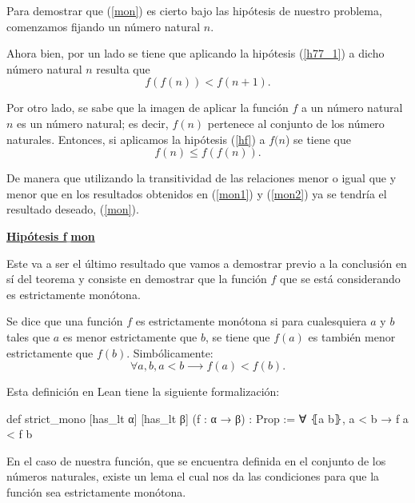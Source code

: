 \begin{demostracion}
  Para demostrar que (\ref{mon}) es cierto bajo las hipótesis de nuestro
  problema, comenzamos fijando un número natural \(n\).

  Ahora bien, por un lado se tiene que aplicando la hipótesis (\ref{h77_1})
  a dicho número natural \(n\) resulta que
  \begin{equation}\label{mon1}
    f(f(n)) < f(n+1).
  \end{equation}

  Por otro lado, se sabe que la imagen de aplicar la función \(f\) a un
  número natural \(n\) es un número natural; es decir, \(f(n)\) pertenece
  al conjunto de los número naturales. Entonces, si aplicamos la
  hipótesis (\ref{hf}) a \(f(n\)) se tiene que
  \begin{equation}\label{mon2}
    f(n) ≤ f(f(n)).
  \end{equation}

  De manera que utilizando la transitividad de las relaciones menor o
  igual que y menor que en los resultados obtenidos en (\ref{mon1}) y
  (\ref{mon2}) ya se tendría el resultado deseado, (\ref{mon}).

  \noindent
  \textbf{\underline{Hipótesis f\(\_\)mon}}

  Este va a ser el último resultado que vamos a demostrar previo a la
  conclusión en sí del teorema y consiste en demostrar que la función
  \(f\) que se está considerando es estrictamente monótona.

  \begin{definicion}\label{def:mono}
    Se dice que una función \(f\) es estrictamente monótona si para
    cualesquiera \(a\) y \(b\) tales que \(a\) es menor estrictamente que
    \(b\), se tiene que \(f(a)\) es también menor estrictamente que
    \(f(b)\). Simbólicamente:
    \begin{equation}
      ∀a,b, a < b ⟶ f(a) < f(b).
    \end{equation}
  \end{definicion}

  Esta definición en Lean tiene la siguiente formalización:
  \begin{leancode}
    def strict_mono [has_lt α] [has_lt β] (f : α → β) : Prop :=
    ∀ ⦃a b⦄, a < b → f a < f b
  \end{leancode}

  En el caso de nuestra función, que se encuentra definida en el conjunto
  de los números naturales, existe un lema el cual nos da las condiciones
  para que la función sea estrictamente monótona.


\end{demostracion}
